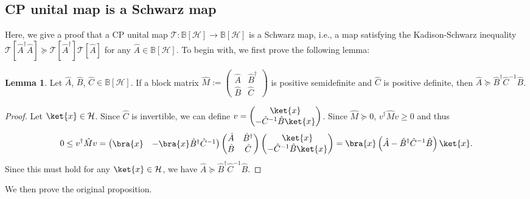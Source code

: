 \documentclass[preprint,pteplogo]{ptephy_v2}%
\numberwithin{equation}{section}
\theoremstyle{definition}
\newtheorem{lemma}[theorem]{Lemma}
\newcommand{\mc}[1]{\mathcal{#1}}
\newcommand{\mbb}[1]{\mathbb{#1}}
\begin{document}
\subsection{CP unital map is a Schwarz map}
\label{app:SchwarzMap}

Here, we give a proof that a CP unital map $\mc{T}: \mbb{B}[\mc{H}] \to \mbb{B}[\mc{H}]$ is a Schwarz map, i.e., a map satisfying the Kadison-Schwarz inequality $\mc{T}[\hat{A}^\dagger \hat{A}] \succeq \mc{T}[\hat{A}^\dagger] \mc{T}[\hat{A}]$ for any $\hat{A} \in \mbb{B}[\mc{H}]$.
To begin with, we first prove the following lemma:

\begin{lemma}
Let $\hat{A}$, $\hat{B}$, $\hat{C} \in \mbb{B}[\mc{H}]$.
If a block matrix $\hat{M} := \begin{pmatrix} \hat{A} & \hat{B}^\dagger \\ \hat{B} & \hat{C} \end{pmatrix}$ is positive semidefinite and $\hat{C}$ is positive definite, then $\hat{A} \succeq \hat{B}^\dagger \hat{C}^{-1} \hat{B}$.
\end{lemma}

\begin{proof}
Let $\ket{x} \in \mc{H}$. 
Since $\hat{C}$ is invertible, we can define $v = \begin{pmatrix} \ket{x} \\ -\hat{C}^{-1} \hat{B} \ket{x} \end{pmatrix}$. 
Since $\hat{M} \succeq 0$, $v^\dagger \hat{M} v \geq 0$ and thus
\begin{align}
0 \leq v^\dagger \hat{M} v 
= \begin{pmatrix} \bra{x} & -\bra{x} \hat{B}^\dagger \hat{C}^{-1} \end{pmatrix} \begin{pmatrix} \hat{A} & \hat{B}^\dagger \\ \hat{B} & \hat{C} \end{pmatrix} \begin{pmatrix} \ket{x} \\ -\hat{C}^{-1} \hat{B} \ket{x} \end{pmatrix}
= \bra{x} \left( \hat{A} - \hat{B}^\dagger \hat{C}^{-1} \hat{B} \right) \ket{x}.
\end{align}
Since this must hold for any $\ket{x} \in \mc{H}$, we have $\hat{A} \succeq \hat{B}^\dagger \hat{C}^{-1} \hat{B}$.
\end{proof}

We then prove the original proposition.
\end{document}
